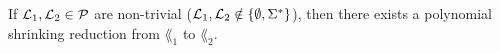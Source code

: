 If $\mathcal{L}_1, \mathcal{L}_2 \in \mathcal{P}$ are non-trivial ($\mathcal{L}_1, \mathcal{L}_2 \notin \{\emptyset, \Sigma^*\}$), then there exists a polynomial shrinking
reduction from $\lang_1$ to $\lang_2$.